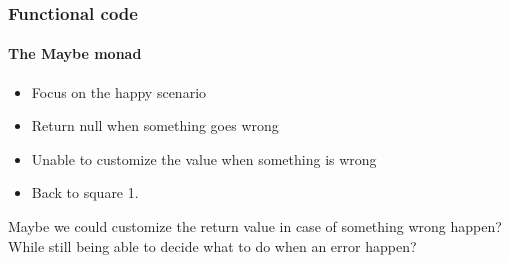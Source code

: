 \begin{frame}
    
\end{frame}

\begin{frame}
    
\end{frame}

\begin{frame}
    
\end{frame}

\begin{frame}
    
\end{frame}

\begin{frame}
    
\end{frame}

\begin{frame}
    
\end{frame}

\begin{frame}
    \frametitle{Functional code}
    \framesubtitle{The Maybe monad}

    \begin{itemize}[<+->]
        \item Focus on the happy scenario
        \item Return null when something goes wrong
        \item Unable to customize the value when something is wrong
        \item Back to square 1.
    \end{itemize}
\end{frame}

\begin{frame}
    Maybe we could customize the return value in case of something wrong happen?\\
    \vspace{1em}
    \pause
    While still being able to decide what to do when an error happen?
\end{frame}

